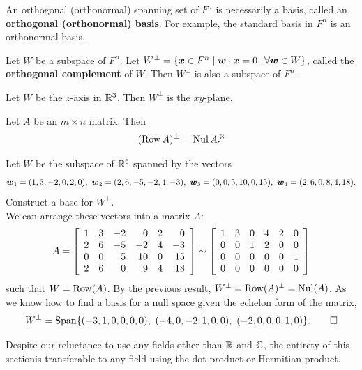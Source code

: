 An orthogonal (orthonormal) spanning set of $F^n$ is necessarily a basis, called an \textbf{orthogonal (orthonormal) basis}. For example, the standard basis in $F^n$ is an orthonormal basis.\\

\begin{Thm}\label{thm:orthocomplement} Let $W$ be a subspace of $F^n$. Let $W^\perp = \{\bb x\in F^n \mid \bb w\cdot \bb x  = 0,\; \forall\bb w\in W\}$, called the \textbf{orthogonal complement} of $W$. Then $W^\perp$ is also a subspace of $F^n$.
\end{Thm}\vs

\begin{Exam} Let $W$ be the $z$-axis in $\R^3$. Then $W^\perp$ is the $xy$-plane.
\end{Exam}\vs

\begin{Thm}\label{thm:rowortho} Let $A$ be an $m\times n$ matrix. Then 
\[(\row A)^\perp = \nul A.\footnotemark[3]\]
\end{Thm}\vs


\begin{Exam} Let $W$ be the subspace of $\R^6$ spanned by the vectors 
\[\bb w_1 = (1,3,-2,0,2,0),\ \bb w_2 = (2,6,-5,-2,4,-3),\ \bb w_3 = (0,0,5,10,0,15),\ \bb w_4 = (2,6,0,8,4,18).\] Construct a base for $W^\perp$.\\

We can arrange these vectors into a matrix $A$:
\[A = \mtx{rrrrrr}{1 & 3 & -2 & 0 & 2 & 0 \\ 2 & 6 & -5 & -2 & 4 & -3 \\ 0 & 0& 5 & 10 & 0 & 15 \\ 2 & 6 & 0 & 9 & 4 & 18} \sim \mtx{rrrrrr}{1 & 3 & 0 & 4 & 2 & 0\\ 0 & 0 & 1 & 2 & 0 &0 \\ 0 &0 & 0 &0 & 0 & 1\\ 0 &0 & 0 &0 & 0 & 0}\] such that $W = \row(A)$. By the previous result, $W^\perp = \row(A)^\perp = \nul(A)$. As we know how to find a basis for a null space given the echelon form of the matrix,  
\[W^\perp = \Span\{ (-3, 1, 0, 0, 0, 0),\ (-4, 0, -2, 1, 0, 0),\ (-2,0,0,0,1,0)\}. \qedhere\]
\end{Exam}\vs

Despite our reluctance to use any fields other than $\R$ and $\C$, the entirety of this section\footnotemark[9] is transferable to any field using the dot product or Hermitian product.


